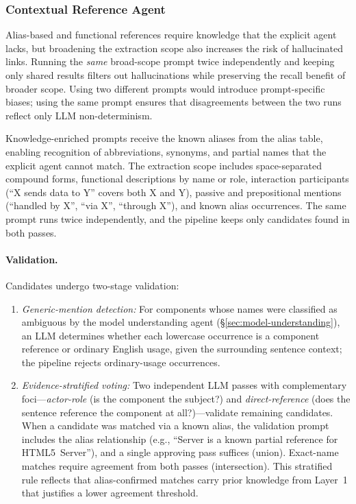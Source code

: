 \subsubsection{Contextual Reference Agent}\label{sec:entity}

Alias-based and functional references require knowledge that the
explicit agent lacks, but broadening the extraction scope also
increases the risk of hallucinated links.
Running the \emph{same} broad-scope prompt twice independently
and keeping only shared results filters out hallucinations while
preserving the recall benefit of broader scope.
Using two different prompts would introduce prompt-specific biases;
using the same prompt ensures that disagreements between the two
runs reflect only LLM non-determinism.

Knowledge-enriched prompts receive the known aliases from the
alias table, enabling recognition of abbreviations, synonyms, and
partial names that the explicit agent cannot match.
The extraction scope includes space-separated compound forms,
functional descriptions by name or role, interaction participants
(``X sends data to Y'' covers both X and Y),
passive and prepositional mentions (``handled by X'', ``via X'',
``through X''), and known alias occurrences.
The same prompt runs twice independently, and the pipeline keeps
only candidates found in both passes.

\paragraph{Validation.}
Candidates undergo two-stage validation:
\begin{enumerate}
    \item \emph{Generic-mention detection:}
      For components whose names were classified as ambiguous by
      the model understanding agent (\S\ref{sec:model-understanding}),
      an LLM determines whether each lowercase occurrence is a
      component reference or ordinary English usage, given the
      surrounding sentence context;
      the pipeline rejects ordinary-usage occurrences.
    \item \emph{Evidence-stratified voting:}
      Two independent LLM passes with complementary
      foci---\emph{actor-role} (is the component the subject?)
      and \emph{direct-reference} (does the sentence reference the
      component at all?)---validate remaining candidates.
      When a candidate was matched via a known alias, the validation
      prompt includes the alias relationship (e.g., ``Server is a
      known partial reference for HTML5~Server''), and a single
      approving pass suffices (union).
      Exact-name matches require agreement from both passes
      (intersection).
      This stratified rule reflects that alias-confirmed
      matches carry prior knowledge from Layer~1 that justifies
      a lower agreement threshold.
\end{enumerate}

